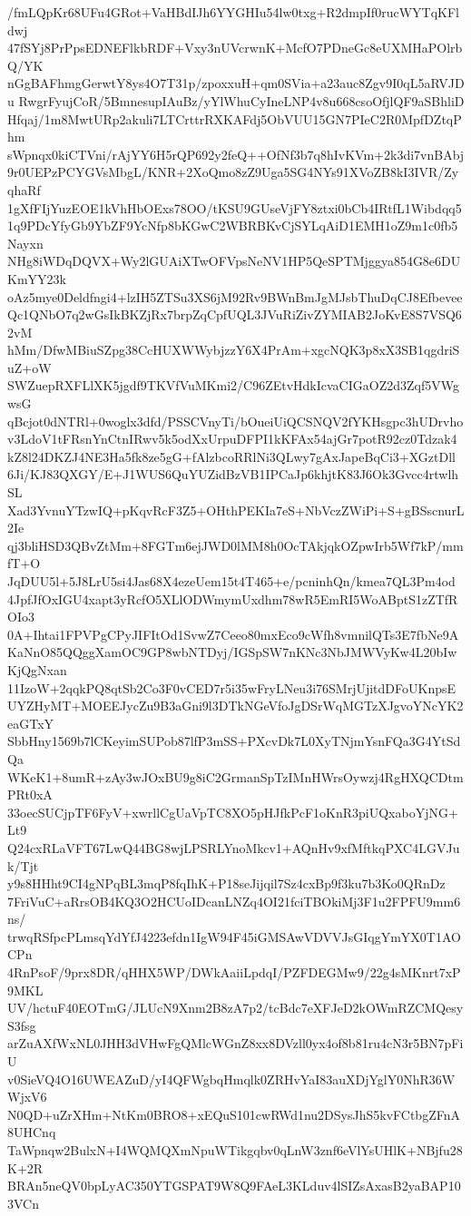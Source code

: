 /fmLQpKr68UFu4GRot+VaHBdIJh6YYGHIu54lw0txg+R2dmpIf0rucWYTqKFldwj
47fSYj8PrPpsEDNEFlkbRDF+Vxy3nUVcrwnK+McfO7PDneGc8eUXMHaPOlrbQ/YK
nGgBAFhmgGerwtY8ys4O7T31p/zpoxxuH+qm0SVia+a23auc8Zgv9I0qL5aRVJDu
RwgrFyujCoR/5BmnesupIAuBz/yYlWhuCyIneLNP4v8u668csoOfjlQF9aSBhliD
Hfqaj/1m8MwtURp2akuli7LTCrttrRXKAFdj5ObVUU15GN7PIeC2R0MpfDZtqPhm
sWpnqx0kiCTVni/rAjYY6H5rQP692y2feQ++OfNf3b7q8hIvKVm+2k3di7vnBAbj
9r0UEPzPCYGVsMbgL/KNR+2XoQmo8zZ9Uga5SG4NYs91XVoZB8kI3IVR/ZyqhaRf
1gXfFIjYuzEOE1kVhHbOExs78OO/tKSU9GUseVjFY8ztxi0bCb4IRtfL1Wibdqq5
1q9PDcYfyGb9YbZF9YcNfp8bKGwC2WBRBKvCjSYLqAiD1EMH1oZ9m1c0fb5Nayxn
NHg8iWDqDQVX+Wy2lGUAiXTwOFVpsNeNV1HP5QeSPTMjggya854G8e6DUKmYY23k
oAz5mye0Deldfngi4+lzIH5ZTSu3XS6jM92Rv9BWnBmJgMJsbThuDqCJ8Efbevee
Qc1QNbO7q2wGsIkBKZjRx7brpZqCpfUQL3JVuRiZivZYMIAB2JoKvE8S7VSQ62vM
hMm/DfwMBiuSZpg38CcHUXWWybjzzY6X4PrAm+xgcNQK3p8xX3SB1qgdriSuZ+oW
SWZuepRXFLlXK5jgdf9TKVfVuMKmi2/C96ZEtvHdkIcvaCIGaOZ2d3Zqf5VWgwsG
qBcjot0dNTRl+0woglx3dfd/PSSCVnyTi/bOueiUiQCSNQV2fYKHsgpc3hUDrvho
v3LdoV1tFRsnYnCtnIRwv5k5odXxUrpuDFPI1kKFAx54ajGr7potR92cz0Tdzak4
kZ8l24DKZJ4NE3Ha5fk8ze5gG+fAlzbcoRRlNi3QLwy7gAxJapeBqCi3+XGztDll
6Ji/KJ83QXGY/E+J1WUS6QuYUZidBzVB1IPCaJp6khjtK83J6Ok3Gvcc4rtwlhSL
Xad3YvnuYTzwIQ+pKqvRcF3Z5+OHthPEKIa7eS+NbVczZWiPi+S+gBSscnurL2Ie
qj3bliHSD3QBvZtMm+8FGTm6ejJWD0lMM8h0OcTAkjqkOZpwIrb5Wf7kP/mmfT+O
JqDUU5l+5J8LrU5si4Jas68X4ezeUem15t4T465+e/pcninhQn/kmea7QL3Pm4od
4JpfJfOxIGU4xapt3yRcfO5XLlODWmymUxdhm78wR5EmRI5WoABptS1zZTfROIo3
0A+Ihtai1FPVPgCPyJIFItOd1SvwZ7Ceeo80mxEco9cWfh8vmnilQTs3E7fbNe9A
KaNnO85QQggXamOC9GP8wbNTDyj/IGSpSW7nKNc3NbJMWVyKw4L20bIwKjQgNxan
11IzoW+2qqkPQ8qtSb2Co3F0vCED7r5i35wFryLNeu3i76SMrjUjitdDFoUKnpsE
UYZHyMT+MOEEJycZu9B3aGni9l3DTkNGeVfoJgDSrWqMGTzXJgvoYNcYK2eaGTxY
SbbHny1569b7lCKeyimSUPob87lfP3mSS+PXcvDk7L0XyTNjmYsnFQa3G4YtSdQa
WKeK1+8umR+zAy3wJOxBU9g8iC2GrmanSpTzIMnHWrsOywzj4RgHXQCDtmPRt0xA
33oecSUCjpTF6FyV+xwrllCgUaVpTC8XO5pHJfkPcF1oKnR3piUQxaboYjNG+Lt9
Q24cxRLaVFT67LwQ44BG8wjLPSRLYnoMkcv1+AQnHv9xfMftkqPXC4LGVJuk/Tjt
y9s8HHht9CI4gNPqBL3mqP8fqIhK+P18seJijqil7Sz4cxBp9f3ku7b3Ko0QRnDz
7FriVuC+aRrsOB4KQ3O2HCUoIDcanLNZq4OI21fciTBOkiMj3F1u2FPFU9mm6ns/
trwqRSfpcPLmsqYdYfJ4223efdn1IgW94F45iGMSAwVDVVJsGIqgYmYX0T1AOCPn
4RnPsoF/9prx8DR/qHHX5WP/DWkAaiiLpdqI/PZFDEGMw9/22g4sMKnrt7xP9MKL
UV/hctuF40EOTmG/JLUcN9Xnm2B8zA7p2/tcBdc7eXFJeD2kOWmRZCMQesyS3fsg
arZuAXfWxNL0JHH3dVHwFgQMlcWGnZ8xx8DVzll0yx4of8b81ru4cN3r5BN7pFiU
v0SieVQ4O16UWEAZuD/yI4QFWgbqHmqlk0ZRHvYaI83auXDjYglY0NhR36WWjxV6
N0QD+uZrXHm+NtKm0BRO8+xEQuS101cwRWd1nu2DSysJhS5kvFCtbgZFnA8UHCnq
TaWpnqw2BulxN+I4WQMQXmNpuWTikgqbv0qLnW3znf6eVlYsUHlK+NBjfu28K+2R
BRAn5neQV0bpLyAC350YTGSPAT9W8Q9FAeL3KLduv4lSIZsAxasB2yaBAP103VCn
